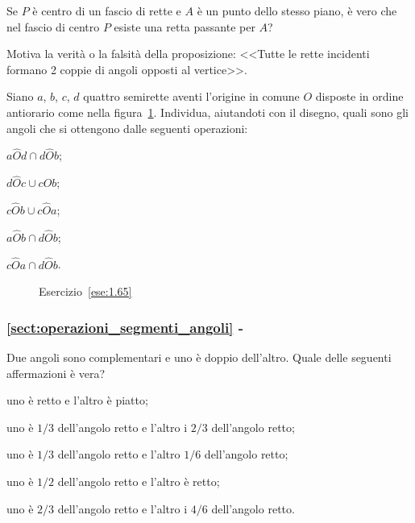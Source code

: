 \begin{esercizio}
\label{ese:1.63}
Se $P$ è centro di un fascio di rette e $A$ è un punto dello stesso 
piano, è vero che nel fascio di centro $P$ esiste una retta passante 
per $A$?
\end{esercizio}

\begin{esercizio}
\label{ese:1.64}
Motiva la verità o la falsità della proposizione: <<Tutte le rette 
incidenti formano 2 coppie di angoli opposti al vertice>>.
\end{esercizio}

\begin{esercizio}
\label{ese:1.65}
Siano $a$, $b$, $c$, $d$ quattro semirette aventi l'origine in comune 
$O$ disposte in ordine antiorario come nella 
figura~\ref{fig:ese1.65}. Individua, aiutandoti con il disegno, quali 
sono gli angoli che si ottengono dalle seguenti operazioni:
\begin{multicols}{3}
\begin{enumeratea}
\item $a\widehat{O}d \cap d\widehat{O}b$;
\item $d\widehat{O}c \cup c\widehat{O}b$;
\item $c\widehat{O}b \cup c\widehat{O}a$;
\item $a\widehat{O}b \cap d\widehat{O}b$;
\item $c\widehat{O}a \cap d\widehat{O}b$.
\end{enumeratea}
\end{multicols}
\end{esercizio}


\begin{inaccessibleblock}
 \begin{figure}[htb]
 \centering
 \caption{Esercizio~\ref{ese:1.65}}\label{fig:ese1.65}
\end{figure}
\end{inaccessibleblock}

\begingroup
\hypersetup{linkcolor=black}
\subsubsection*{\ref{sect:operazioni_segmenti_angoli} - 
}
\endgroup

\begin{esercizio}
\label{ese:1.66}
Due angoli sono complementari e uno è doppio dell'altro. Quale delle 
seguenti affermazioni è vera?
\begin{enumeratea}
\item uno è retto e l'altro è piatto;
\item uno è $1/3$ dell'angolo retto e l'altro i $2/3$ dell'angolo 
retto;
\item uno è $1/3$ dell'angolo retto e l'altro $1/6$ dell'angolo retto;
\item uno è $1/2$ dell'angolo retto e l'altro è retto;
\item uno è $2/3$ dell'angolo retto e l'altro i $4/6$ dell'angolo 
retto.
\end{enumeratea}
\end{esercizio}

